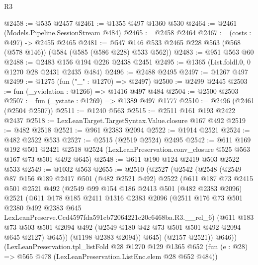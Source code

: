\begin{lexlean}{R3}
\begin{coremodule}
@2458 := @535 @2457
@2461 := @1355 @497 @1360 @530
@2464 := @2461 (Models.Pipeline.SessionStream @484)
@2465 := @2458 @2464
@2467 := (costs : @497) -> @2455 @2465
@2481 := @547 @146 @533 @2465 @228 @563 (@568 (@578 @146)) (@584 (@585 (@586 @228) @533 @562))
@2483 := @951 @563 @60
@2488 := @2483 @156 @194 @226 @2438 @2451
@2495 := @1365 (List.foldl.{0, 0} @1270 @28 @2431 @2435 @484)
@2496 := @2488 @2495
@2497 := @1267 @497
@2499 := @1275 (fun ("_" : @1270) => @2497)
@2500 := @2499 @2445
@2503 := fun (_yviolation : @1266) => @1416 @497 @484
@2504 := @2500 @2503
@2507 := fun (_ystate : @1269) => @1389 @497 @1777
@2510 := @2496 (@2461 (@2504 @2507))
@2511 := @1240 @563
@2515 := @2511 @161 @193 @2422 @2437
@2518 := LexLeanTarget.TargetSyntax.Value.closure @167 @492
@2519 := @482 @2518
@2521 := @961 @2383 @2094
@2522 := @1914 @2521
@2524 := @482 @2522 @533
@2527 := @2515 (@2519 @2524) @2495
@2542 := @611
    @169
    @192
    @501
    @2421
    @2518
    @2524
    (LexLeanPreservation.conv_closure @525 @563 @167 @73 @501 @492 @645)
@2548 := @611 @190 @124 @2419 @503 @2522 @533
@2549 := @1032 @563
@2655 := @2510
    (@2527
      (@2542
        (@2548
          (@2549
            @87
            @156
            @189
            @2417
            @501
            (@482 @2521 @492)
            @2522
            (@611
              @187
              @73
              @2415
              @501
              @2521
              @492
              (@2549
                @99
                @154
                @186
                @2413
                @501
                (@482 @2383 @2096)
                @2521
                (@611
                  @178
                  @185
                  @2411
                  @1316
                  @2383
                  @2096
                  (@2511
                    @176
                    @73
                    @501
                    @2380
                    @492
                    @2383
                    @645
                    LexLeanPreserve.Ccd4597fda591cb72064221c20c6468ba.R3.__rel_6)
                  (@611
                    @183
                    @73
                    @503
                    @501
                    @2094
                    @492
                    (@2549 @180 @42 @73 @501 @501 @492 @2094 @645 @2127)
                    @645))
                (@1198 @2383 @2094))
              @645)
            (@2157 @2521))
          @646))
      (LexLeanPreservation.tpl_listFold
        @28
        @1270
        @129
        @1365
        @652
        (fun (e : @28) => @565 @478 (LexLeanPreservation.ListEnc.elem @28 @652 @484))

\end{coremodule}
\end{lexlean}
